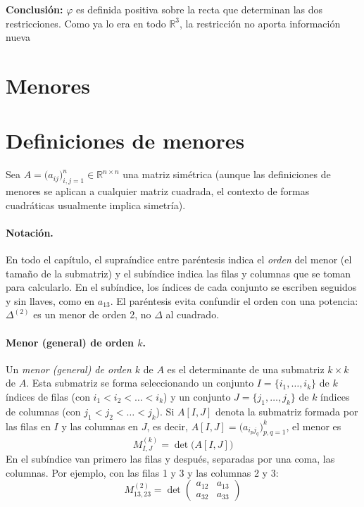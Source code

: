 \documentclass{article}
\begin{document}
{\color{teal}
\textbf{Conclusión:} \(\varphi\) es definida positiva sobre la recta que determinan las dos restricciones. Como ya lo era en todo \(\mathbb{R}^3\), la restricción no aporta información nueva}



\newpage

\section{Menores}



\section*{Definiciones de menores}

Sea \(A=\bigl(a_{ij}\bigr)_{i,j=1}^n\in\mathbb{R}^{n\times n}\) una matriz simétrica (aunque las definiciones de menores se aplican a cualquier matriz cuadrada, el contexto de formas cuadráticas usualmente implica simetría).

\paragraph{Notación.}
En todo el capítulo, el supraíndice entre paréntesis indica el \emph{orden} del menor (el tamaño de la submatriz) y el subíndice indica las filas y columnas que se toman para calcularlo. En el subíndice, los índices de cada conjunto se escriben seguidos y sin llaves, como en \(a_{13}\). El paréntesis evita confundir el orden con una potencia: \(\Delta^{(2)}\) es un menor de orden 2, no \(\Delta\) al cuadrado.

\paragraph{Menor (general) de orden \(k\).}
Un \emph{menor (general) de orden \(k\)} de \(A\) es el determinante de una submatriz \(k\times k\) de \(A\). Esta submatriz se forma seleccionando un conjunto \(I=\{i_1,\dots,i_k\}\) de \(k\) índices de filas (con \(i_1<i_2<\dots<i_k\)) y un conjunto \(J=\{j_1,\dots,j_k\}\) de \(k\) índices de columnas (con \(j_1<j_2<\dots<j_k\)). Si \(A[I,J]\) denota la submatriz formada por las filas en \(I\) y las columnas en \(J\), es decir, \(A[I,J]=\bigl(a_{i_pj_q}\bigr)_{p,q=1}^k\), el menor es
\[
M^{(k)}_{I,J}=\det\bigl(A[I,J]\bigr)
\]
En el subíndice van primero las filas y después, separadas por una coma, las columnas. Por ejemplo, con las filas 1 y 3 y las columnas 2 y 3:
\[
M^{(2)}_{13,23}=\det\begin{pmatrix}a_{12}&a_{13}\\a_{32}&a_{33}\end{pmatrix}
\]
\end{document}
